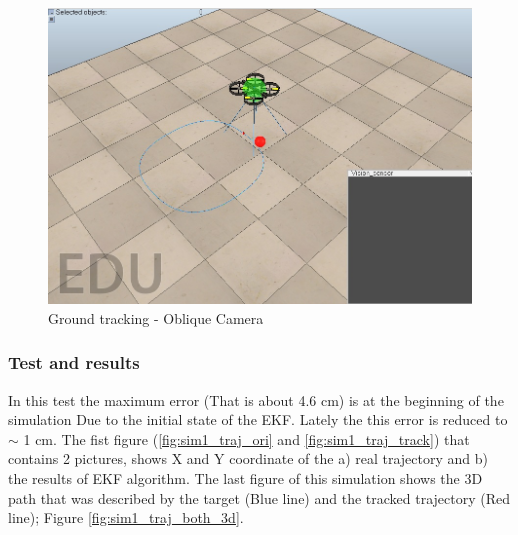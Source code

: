 \begin{figure}[ht]
	\centering
	\includegraphics[width=0.7\linewidth]{../Images/c3/ground_tracking_scene_vertical}
	\caption{Ground tracking - Oblique Camera}
	\label{fig:ground_tracking_scene_vertical}
\end{figure}

\subsubsection{Test and results}

	In this test the maximum error (That is about 4.6 cm) is at the beginning of the simulation Due to the initial state of the EKF. Lately the this error is reduced to $\sim$ 1 cm. The fist figure (\ref{fig:sim1_traj_ori} and \ref{fig:sim1_traj_track}) that contains 2 pictures, shows X and Y coordinate of the a) real trajectory and b) the results of EKF algorithm. The last figure of this simulation shows the 3D path that was described by the target (Blue line) and the tracked trajectory (Red line); Figure \ref{fig:sim1_traj_both_3d}.
	
